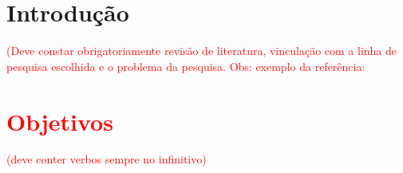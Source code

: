 \documentclass[12pt,a4paper,oneside]{book}
\begin{document}
\chapter{Introdu\c{c}\~{a}o}
\textcolor{red}{(Deve constar obrigatoriamente revis\~{a}o de literatura,
vincula\c{c}\~{a}o com a linha de pesquisa escolhida e o problema da pesquisa.
Obs: exemplo da refer\^{e}ncia:

\autocite{ANIL2015}
\cite{ANIL2015}
\citeauthor{ANIL2015}
\textcite{ANIL2015}

\autocite{BREUEL2013}
\cite{BREUEL2013}
\citeauthor{BREUEL2013}
\textcite{BREUEL2013}

\autocite{CHANDARANA2014}
\cite{CHANDARANA2014}
\citeauthor{CHANDARANA2014}
\textcite{CHANDARANA2014}

\autocite{ELAGOUNI2012}
\cite{ELAGOUNI2012}
\citeauthor{ELAGOUNI2012}
\textcite{ELAGOUNI2012}

\autocite{GUPTA2007}
\cite{GUPTA2007}
\citeauthor{GUPTA2007}
\textcite{GUPTA2007}

\autocite{MILYAEV2013}
\cite{MILYAEV2013}
\citeauthor{MILYAEV2013}
\textcite{MILYAEV2013}

\autocite{MOHAMMAD2017}
\cite{MOHAMMAD2017}
\citeauthor{MOHAMMAD2017}
\textcite{MOHAMMAD2017}

\autocite{SAHU2015}
\cite{SAHU2015}
\citeauthor{SAHU2015}
\textcite{SAHU2015}

\autocite{BLUCHE2016}
\cite{BLUCHE2016}
\citeauthor{BLUCHE2016}
\textcite{BLUCHE2016}

\autocite{CAMPOS2009}
\cite{CAMPOS2009}
\citeauthor{CAMPOS2009}
\textcite{CAMPOS2009}

\autocite{CHRISTY2017}
\cite{CHRISTY2017}
\citeauthor{CHRISTY2017}
\textcite{CHRISTY2017}

\autocite{GOODFELLOW2013}
\cite{GOODFELLOW2013}
\citeauthor{GOODFELLOW2013}
\textcite{GOODFELLOW2013}

\autocite{JADERBERG2014}
\cite{JADERBERG2014}
\citeauthor{JADERBERG2014}
\textcite{JADERBERG2014}

\autocite{MOHAMMAD2014}
\cite{MOHAMMAD2014}
\citeauthor{MOHAMMAD2014}
\textcite{MOHAMMAD2014}

\autocite{NEWELL2011}
\cite{NEWELL2011}
\citeauthor{NEWELL2011}
\textcite{NEWELL2011}

\autocite{SAWANT2016}
\cite{SAWANT2016}
\citeauthor{SAWANT2016}
\textcite{SAWANT2016}

\pagebreak
\chapter{Objetivos}
\textcolor{red}{(deve conter verbos sempre no infinitivo)}
}
\end{document}
